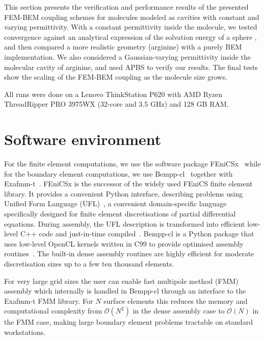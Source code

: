 This section presents the verification and performance results of the presented FEM-BEM coupling schemes for molecules modeled as cavities with constant and varying permittivity.
With a constant permittivity inside the molecule, we tested convergence against an analytical expression of the solvation energy of a sphere \cite{Kirkwood1934}, and then compared a more realistic geometry (arginine) with a purely BEM implementation.
We also considered a Gaussian-varying permittivity\cite{grant2001smooth,li2013dielectric} inside the molecular cavity of arginine, and used APBS \cite{BakerETal2001} to verify our results.
The final tests show the scaling of the FEM-BEM coupling as the molecule size grows. 

All runs were done on a Lenovo ThinkStation P620 with AMD Ryzen ThreadRipper PRO 3975WX (32-core and 3.5 GHz) and 128 GB RAM. 

\section*{\sffamily \Large Software environment}

For the finite element computations, we use the software package FEniCSx~\cite{BasixJoss,BasixDofTransformations} while for the boundary element computations, we use Bempp-cl~\cite{BetckeScroggs2021} together with Exafmm-t~\cite{exafmm-t}. FEniCSx is the successor of the widely used FEniCS finite element library\cite{FEniCS,FEniCS-book}.
It provides a convenient Python interface, describing problems using Unified Form Language (UFL)~\cite{UFL}, a convenient domain-specific language specifically designed for finite element discretisations of partial differential equations. During assembly, the UFL description is transformed into efficient low-level C++ code and just-in-time compiled~\cite{ffc1,ffc2}. Bempp-cl is a Python package that uses low-level OpenCL kernels written in C99 to provide optimised assembly routines~\cite{2021-cise}. The built-in dense assembly routines are highly efficient for moderate discretisation sizes up to a few ten thousand elements.

For very large grid sizes the user can enable fast multipole method (FMM) assembly which internally is handled in Bempp-cl through an interface to the Exafmm-t FMM library. For $N$ surface elements this reduces the memory and computational complexity from $\mathcal{O}(N^2)$ in the dense assembly case to $\mathcal{O}(N)$ in the FMM case, making large boundary element problems tractable on standard workstations.

